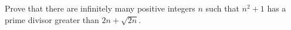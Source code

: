 Prove that there are infinitely many positive integers $ n$ such that $ n^{2} + 1$ has a prime divisor greater than $ 2n + \sqrt {2n}$.